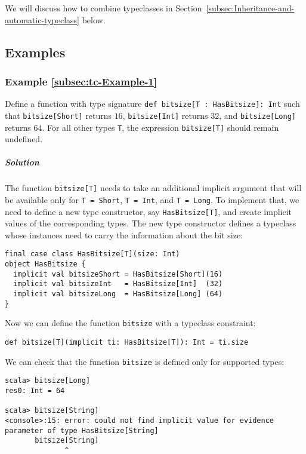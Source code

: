 We will discuss how to combine typeclasses in Section~\ref{subsec:Inheritance-and-automatic-typeclass}
below.

\subsection{Examples}

\subsubsection{Example \label{subsec:tc-Example-1}\ref{subsec:tc-Example-1}}

Define a function with type signature \lstinline!def bitsize[T : HasBitsize]: Int!
such that \lstinline!bitsize[Short]! returns $16$, \lstinline!bitsize[Int]!
returns $32$, and \lstinline!bitsize[Long]! returns $64$. For all
other types \lstinline!T!, the expression \lstinline!bitsize[T]!
should remain undefined.

\subparagraph{Solution}

The function \lstinline!bitsize[T]! needs to take an additional implicit
argument that will be available only for \lstinline!T = Short!, \lstinline!T = Int!,
and \lstinline!T = Long!. To implement that, we need to define a
new type constructor, say \lstinline!HasBitsize[T]!, and create implicit
values of the corresponding types. The new type constructor defines
a typeclass whose instances need to carry the information about the
bit size:
\begin{lstlisting}
final case class HasBitsize[T](size: Int)
object HasBitsize {
  implicit val bitsizeShort = HasBitsize[Short](16)
  implicit val bitsizeInt   = HasBitsize[Int]  (32)
  implicit val bitsizeLong  = HasBitsize[Long] (64)
}
\end{lstlisting}
Now we can define the function \lstinline!bitsize! with a typeclass
constraint:
\begin{lstlisting}
def bitsize[T](implicit ti: HasBitsize[T]): Int = ti.size
\end{lstlisting}

We can check that the function \lstinline!bitsize! is defined only
for supported types:
\begin{lstlisting}
scala> bitsize[Long]
res0: Int = 64

scala> bitsize[String]
<console>:15: error: could not find implicit value for evidence parameter of type HasBitsize[String]
       bitsize[String]
              ^ 
\end{lstlisting}

